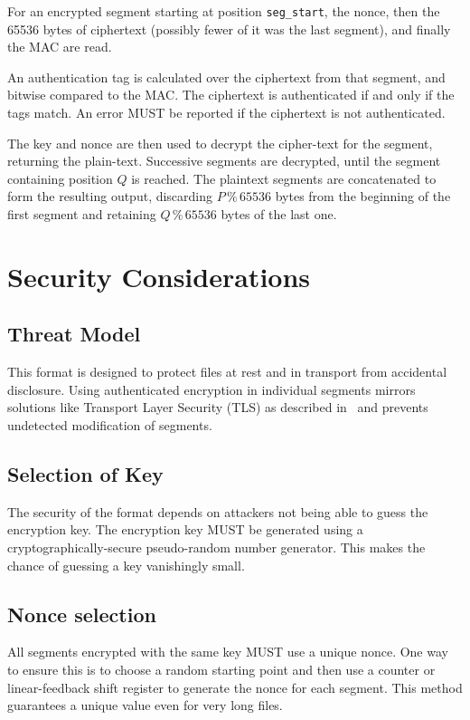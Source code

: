 \documentclass[10pt]{article}
\newcommand{\kw}[1]{\texttt{#1}}
\begin{document}
For an encrypted segment starting at position \kw{seg\_start}, the nonce, then the 65536 bytes of ciphertext
(possibly fewer of it was the last segment), and finally the MAC are read.

An authentication tag is calculated over the ciphertext from that segment, and bitwise compared to the MAC.
The ciphertext is authenticated if and only if the tags match.
An error MUST be reported if the ciphertext is not authenticated.

The key and nonce are then used to decrypt the cipher-text for the segment, returning the plain-text.
Successive segments are decrypted, until the segment containing position $Q$ is reached.
The plaintext segments are concatenated to form the resulting output, discarding $P \mathbin{\%} 65536$ bytes from
the beginning of the first segment and retaining $Q \mathbin{\%} 65536$ bytes of the last one.

\section{Security Considerations}
\subsection{Threat Model}
This format is designed to protect files at rest and in transport from accidental disclosure.
Using authenticated encryption in individual segments mirrors solutions like Transport Layer
Security (TLS) as described in~\cite{RFC5246} and prevents undetected modification of segments.

\subsection{Selection of Key}
The security of the format depends on attackers not being able to guess the encryption key.
The encryption key MUST be generated using a cryptographically-secure pseudo-random number generator.
This makes the chance of guessing a key vanishingly small.

\subsection{Nonce selection}
All segments encrypted with the same key MUST use a unique nonce.
One way to ensure this is to choose a random starting point and then use a counter or linear-feedback shift
register to generate the nonce for each segment.
This method guarantees a unique value even for very long files.
\end{document}
